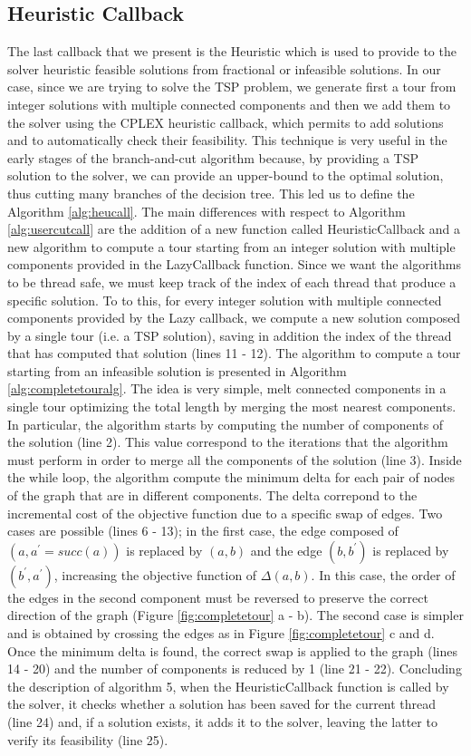 \subsection{Heuristic Callback}
\label{callHeu}
The last callback that we present is the Heuristic which is used to provide to the solver heuristic feasible solutions from fractional or infeasible solutions. 
In our case, since we are trying to solve the TSP problem, we generate first a tour from integer solutions with multiple connected components and then we add them to the solver using the CPLEX heuristic callback, which permits to add solutions and to automatically check their feasibility. This technique is very useful in the early stages of the branch-and-cut algorithm because, by providing a TSP solution to the solver, we can provide an upper-bound to the optimal solution, thus cutting many branches of the decision tree. This led us to define the Algorithm \ref{alg:heucall}. The main differences with respect to Algorithm \ref{alg:usercutcall} are the addition of a new function called HeuristicCallback and a new algorithm to compute a tour starting from an integer solution with multiple components provided in the LazyCallback function. Since we want the algorithms to be thread safe, we must keep track of the index of each thread that produce a specific solution. To to this, for every integer solution with multiple connected components provided by the Lazy callback, we compute a new solution composed by a single tour (i.e. a TSP solution), saving in addition the index of the thread that has computed that solution (lines 11 - 12).
The algorithm to compute a tour starting from an infeasible solution is presented in Algorithm \ref{alg:completetouralg}. The idea is very simple, melt connected components in a single tour optimizing the total length by merging the most nearest components.
In particular, the algorithm starts by computing the number of components of the solution (line 2). This value correspond to the iterations that the algorithm must perform in order to merge all the components of the solution (line 3). Inside the while loop, the algorithm compute the minimum delta for each pair of nodes of the graph that are in different components. The delta correpond to the incremental cost of the objective function due to a specific swap of edges. Two cases are possible (lines 6 - 13); in the first case, the edge composed of $(a, a^{\prime} = \textit{succ}(a))$ is replaced by $(a, b)$ and the edge $(b, b^{\prime})$ is replaced by $(b^{\prime}, a^{\prime})$, increasing the objective function of $\Delta(a,b)$. In this case, the order of the edges in the second component must be reversed to preserve the correct direction of the graph (Figure \ref{fig:completetour} a - b). The second case is simpler and is obtained by crossing the edges as in Figure \ref{fig:completetour} c and d. Once the minimum delta is found, the correct swap is applied to the graph (lines 14 - 20) and the number of components is reduced by 1 (line 21 - 22). 
Concluding the description of algorithm 5, when the HeuristicCallback function is called by the solver, it checks whether a solution has been saved for the current thread (line 24) and, if a solution exists, it adds it to the solver, leaving the latter to verify its feasibility (line 25).

